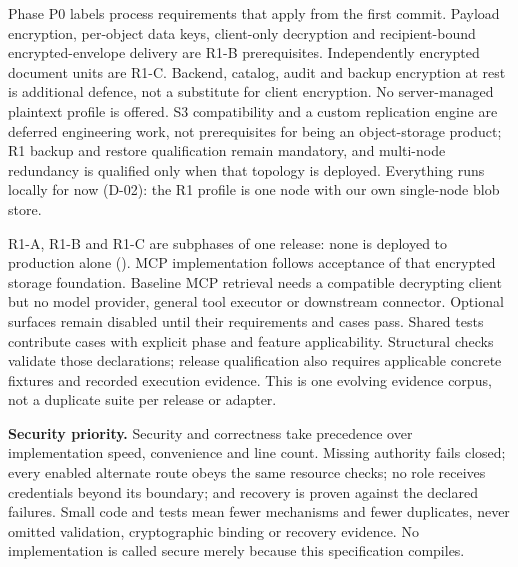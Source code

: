 Phase P0 labels process requirements that apply from the first commit. Payload encryption, per-object data keys, client-only decryption and recipient-bound encrypted-envelope delivery are R1-B prerequisites. Independently encrypted document units are R1-C. Backend, catalog, audit and backup encryption at rest is additional defence, not a substitute for client encryption. No server-managed plaintext profile is offered. S3 compatibility and a custom replication engine are deferred engineering work, not prerequisites for being an object-storage product; R1 backup and restore qualification remain mandatory, and multi-node redundancy is qualified only when that topology is deployed. Everything runs locally for now (D-02): the R1 profile is one node with our own single-node blob store.

R1-A, R1-B and R1-C are subphases of one release: none is deployed to production alone (). MCP implementation follows acceptance of that encrypted storage foundation. Baseline MCP retrieval needs a compatible decrypting client but no model provider, general tool executor or downstream connector. Optional surfaces remain disabled until their requirements and cases pass. Shared tests contribute cases with explicit phase and feature applicability. Structural checks validate those declarations; release qualification also requires applicable concrete fixtures and recorded execution evidence. This is one evolving evidence corpus, not a duplicate suite per release or adapter.

\textbf{Security priority.} Security and correctness take precedence over implementation speed, convenience and line count. Missing authority fails closed; every enabled alternate route obeys the same resource checks; no role receives credentials beyond its boundary; and recovery is proven against the declared failures. Small code and tests mean fewer mechanisms and fewer duplicates, never omitted validation, cryptographic binding or recovery evidence. No implementation is called secure merely because this specification compiles.

